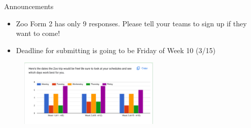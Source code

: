 \begin{frame}{Announcements}
    \begin{itemize}
        \item Zoo Form 2 has only 9 responses. Please tell your teams to sign up if they want to come!
        \item Deadline for submitting is going to be Friday of Week 10 (3/15)
    \end{itemize}

    \begin{figure}
        \centering
        \includegraphics[height=0.7\textheight,width=0.6\textwidth,keepaspectratio]{images/ZooTripSurvey.png}
    \end{figure}
\end{frame}
